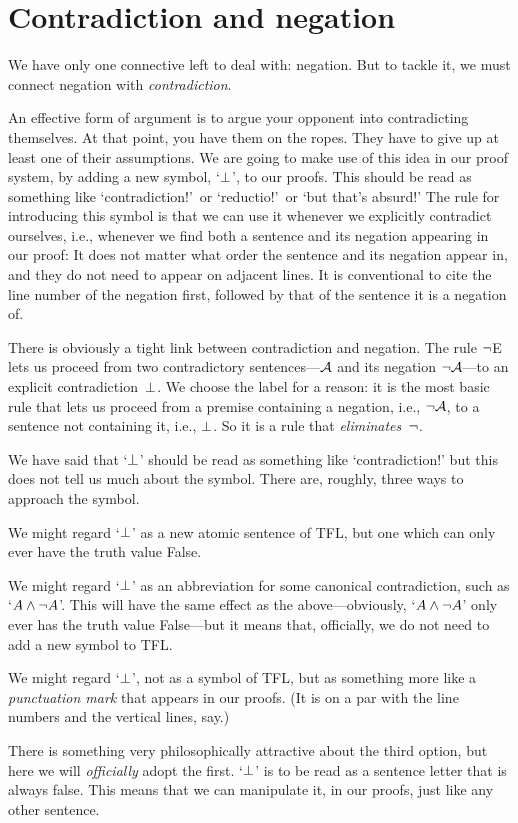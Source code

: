 \section{Contradiction and negation}\label{sec:contradiction}

We have only one connective left to deal with: negation. But to tackle it, we must connect negation with \emph{contradiction}.

An effective form of argument is to argue your opponent into contradicting themselves. At that point, you have them on the ropes. They have to give up at least one of their assumptions. We are going to make use of this idea in our proof system, by adding a new symbol, `$\bot$', to our proofs. This should be read as something like `contradiction!'\ or `reductio!'\ or `but that's absurd!'  The rule for introducing this symbol is that we can use it whenever we explicitly contradict ourselves, i.e., whenever we find both a sentence and its negation appearing in our proof:
It does not matter what order the sentence and its negation appear in,
and they do not need to appear on adjacent lines. It is conventional
to cite the line number of the negation first, followed by that of the
sentence it is a negation of.

There is obviously a tight link between contradiction and negation.
The rule $\neg$E lets us proceed from two contradictory sentences---$\mathcal{A}$ and its negation $\neg \mathcal{A}$---to an explicit contradiction~$\bot$. We choose the label for a reason: it is the most basic rule that lets us proceed from a premise containing a negation, i.e., $\neg\mathcal{A}$, to a sentence not containing it, i.e., $\bot$. So it is a rule that \emph{eliminates}~$\neg$.

We have said that `$\bot$' should be read as something like `contradiction!' but this does not tell us much about the symbol. There are, roughly, three ways to approach the symbol.
	\begin{compactlist}
		\item We might regard `$\bot$' as a new atomic sentence of TFL, but one which can only ever have the truth value False.
		\item We might regard `$\bot$' as an abbreviation for some canonical contradiction, such as `$A \wedge \neg A$'. This will have the same effect as the above---obviously, `$A \wedge \neg A$' only ever has the truth value False---but it means that, officially, we do not need to add a new symbol to TFL.
		\item We might regard `$\bot$', not as a symbol of TFL, but as something more like a \emph{punctuation mark} that appears in our proofs. (It is on a par with the line numbers and the vertical lines, say.)
	\end{compactlist}
There is something very philosophically attractive about the third option, but here we will \emph{officially} adopt the first. `$\bot$' is to be read as a sentence letter that is always false. This means that we can manipulate it, in our proofs, just like any other sentence.

